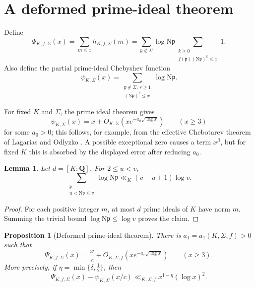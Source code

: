\documentclass[11pt]{article}
\newtheorem{proposition}[theorem]{Proposition}
\newtheorem{lemma}[theorem]{Lemma}
\newcommand{\Norm}{\mathrm N}
\begin{document}
\section{A deformed prime-ideal theorem}

Define
\[
\Psi_{K,f,\Sigma}(x)
=
\sum_{m\le x}h_{K,f,\Sigma}(m)
=
\sum_{\mathfrak p\notin\Sigma}
\log\Norm\mathfrak p
\sum_{\substack{k\ge0\\
f(\mathfrak p)(\Norm\mathfrak p)^k\le x}}
1.
\]
Also define the partial prime-ideal Chebyshev function
\[
\psi_{K,\Sigma}(x)
=
\sum_{\substack{\mathfrak p\notin\Sigma,\ r\ge1\\
(\Norm\mathfrak p)^r\le x}}
\log\Norm\mathfrak p.
\]

For fixed \(K\) and \(\Sigma\), the prime ideal theorem gives
\[
\psi_{K,\Sigma}(x)
=
x+
O_{K,\Sigma}\!\left(
x e^{-a_0\sqrt{\log x}}
\right)
\qquad(x\ge3)
\]
for some \(a_0>0\); this follows, for example, from the effective
Chebotarev theorem of Lagarias and Odlyzko
\cite{LagariasOdlyzko}.  A possible exceptional zero causes a term
\(x^\beta\), but for fixed \(K\) this is absorbed by the displayed
error after reducing \(a_0\).

\begin{lemma}\label{lem:interval}
Let \(d=[K:\mathbf Q]\).  For \(2\le u<v\),
\[
\sum_{\substack{\mathfrak p\\
u<\Norm\mathfrak p\le v}}
\log\Norm\mathfrak p
\ll_K
(v-u+1)\log v.
\]
\end{lemma}

\begin{proof}
For each positive integer \(m\), at most \(d\) prime ideals of \(K\)
have norm \(m\).  Summing the trivial bound
\(\log\Norm\mathfrak p\le\log v\) proves the claim.
\end{proof}

\begin{proposition}[Deformed prime-ideal theorem]
\label{prop:deformed-pit}
There is \(a_1=a_1(K,\Sigma,f)>0\) such that
\[
\Psi_{K,f,\Sigma}(x)
=
\frac{x}{c}
+
O_{K,\Sigma,f}\!\left(
x e^{-a_1\sqrt{\log x}}
\right)
\qquad(x\ge3).
\]
More precisely, if
\(\eta=\min\{\delta,\tfrac12\}\), then
\[
\Psi_{K,f,\Sigma}(x)
-
\psi_{K,\Sigma}(x/c)
\ll_{K,\Sigma,f}
x^{1-\eta}(\log x)^2.
\]
\end{proposition}
\end{document}
